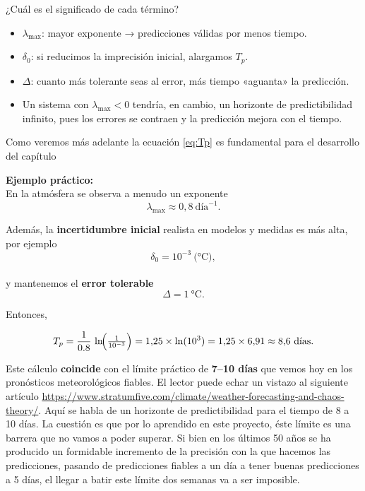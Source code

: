 \documentclass[
  10pt,
  a4paper,
  DIV=11,
  numbers=noendperiod,
  open=any]{scrreprt}
\providecommand{\tightlist}{%
  \setlength{\itemsep}{0pt}\setlength{\parskip}{0pt}}
\numberwithin{equation}{chapter}
\numberwithin{equation}{section}
\renewcommand{\[}{\begin{equation}}
\renewcommand{\]}{\end{equation}}
\begin{document}
¿Cuál es el significado de cada término?

\begin{itemize}
\tightlist
\item
  \textbf{\(\lambda_{\max}\)}: mayor exponente → predicciones válidas
  por menos tiempo.\\
\item
  \textbf{\(\delta_0\)}: si reducimos la imprecisión inicial, alargamos
  \(T_p\).\\
\item
  \textbf{\(\Delta\)}: cuanto más tolerante seas al error, más tiempo
  «aguanta» la predicción.
\item
  Un sistema con \(\lambda_{\max}<0\) tendría, en cambio, un horizonte
  de predictibilidad infinito, pues los errores se contraen y la
  predicción mejora con el tiempo.
\end{itemize}

Como veremos más adelante la ecuación \eqref{eq:Tp} es fundamental para el desarrollo del capítulo 


\textbf{Ejemplo práctico:}\\
En la atmósfera se observa a menudo un exponente\\
\[
\lambda_{\max} \approx 0{,}8\ \text{día}^{-1}.
\]

Además, la \textbf{incertidumbre inicial} realista en modelos y medidas
es más alta, por ejemplo\\
\[
\delta_0 = 10^{-3}\ \text{(°C)},
\]\\
y mantenemos el \textbf{error tolerable}\\
\[
\Delta = 1\ \text{°C}.
\]

Entonces,

\begin{equation}
T_p
= \frac{1}{0.8}\,\ln\!\Bigl(\tfrac{1}{10^{-3}}\Bigr)
=1{,}25 \times \ln(10^3)
=1{,}25 \times 6{,}91
\approx 8{,}6\ \text{días}.
\end{equation}

Este cálculo \textbf{coincide} con el límite práctico de \textbf{7--10
días} que vemos hoy en los pronósticos meteorológicos fiables. El lector
puede echar un vistazo al siguiente artículo \url{https://www.stratumfive.com/climate/weather-forecasting-and-chaos-theory/}. Aquí se habla de un horizonte de predictibilidad para el tiempo de 8 a
10 días. La cuestión es que por lo aprendido en este proyecto, éste
límite es una barrera que no vamos a poder superar. Si bien en los
últimos 50 años se ha producido un formidable incremento de la precisión
con la que hacemos las predicciones, pasando de predicciones fiables a
un día a tener buenas predicciones a 5 días, el llegar a batir este
límite dos semanas va a ser imposible.
\end{document}
